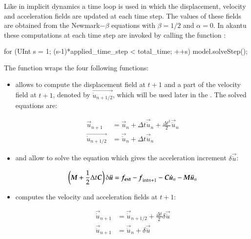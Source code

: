 Like in implicit dynamics a time loop is used in which the
displacement, velocity and acceleration fields are updated at each
time step. The values of these fields are obtained from the
Newmark$-\beta$ equations with $\beta=1/2$ and $\alpha=0$. In akantu
these computations at each time step are invoked by calling the
function :
\begin{cpp} for (UInt s = 1; (s-1)*applied_time_step < total_time;
++s) { model.solveStep(); }
\end{cpp}  The function
 wraps the four following functions:
\begin{itemize}
\item {} allows to compute the displacement
field at $t+1$ and a part of the velocity field at $t+1$, denoted by
$\vec{\dot{u}_{n+1/2}}$, which will be used later in the
. The solved equations are:

  \begin{align} \vec{u}_{n+1} &= \vec{u}_{n} + \Delta t
\vec{\dot{u}}_{n} + \frac{\Delta t^2}{2} \vec{\ddot{u}}_{n}\\
\vec{\dot{u}_{n+1/2}} &= \vec{\dot{u}}_{n} + \Delta t
\vec{\ddot{u}}_{n}
    \label{eqn:smm:explicit:onehalfvelocity}
  \end{align}

\item {} and
 allow to solve the equation which
gives the acceleration increment $\delta \vec{\ddot{u}}$:

  \begin{equation} \left(\boldsymbol{M} + \frac{1}{2} \Delta t \boldsymbol{C}\right)
\delta \boldsymbol{\ddot{u}} = \boldsymbol{f_{{\mathrm{ext}}}} - \boldsymbol{f}_{{\mathrm{int}}n+1} -
\boldsymbol{C} \boldsymbol{\dot{u}}_{n} - \boldsymbol{M} \boldsymbol{\ddot{u}}_{n}
  \end{equation}


\item {} computes the velocity and
acceleration fields at $t+1$:

  \begin{align} \vec{\dot{u}}_{n+1} &= \vec{\dot{u}}_{n+1/2} +
\frac{\Delta t}{2} \delta \vec{\ddot{u}} \\ \vec{\ddot{u}}_{n+1} &=
\vec{\ddot{u}}_{n} + \delta \vec{\ddot{u}}
  \end{align}
\end{itemize}


